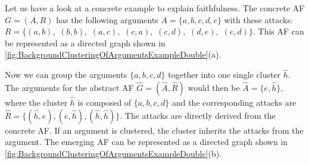 Let us have a look at a concrete example to explain faithfulness. The concrete AF $G=(A, R)$ has the following arguments $A=\{a, b, c, d, e\}$ with these attacks:
$R=\bigl\{(a,b),$
$(b,b),$
$(a,c),$
$(c,a),$
$(c,d),$
$(d,e),$
$(e,d)\bigl\}$. This AF can be represented as a directed graph shown in \cref{fig:BackgroundClusteringOfArgumentsExampleDouble}(a).

Now we can group the arguments $\{a, b, c, d\}$ together into one single cluster $\hat{h}$. The arguments for the abstract AF $\hat{G}=(\hat{A}, \hat{R})$ would then be $\hat{A}=\{e, \hat{h}\}$, where the cluster $\hat{h}$ is composed of $\{a, b, c, d\}$ and the corresponding attacks are
$\hat{R}=\bigl\{(\hat{h}, e), (e, \hat{h}), (\hat{h}, \hat{h})\bigl\}$. The attacks are directly derived from the concrete AF. If an argument is clustered, the cluster inherits the attacks from the argument. The emerging AF can be represented as a directed graph shown in \cref{fig:BackgroundClusteringOfArgumentsExampleDouble}(b).


